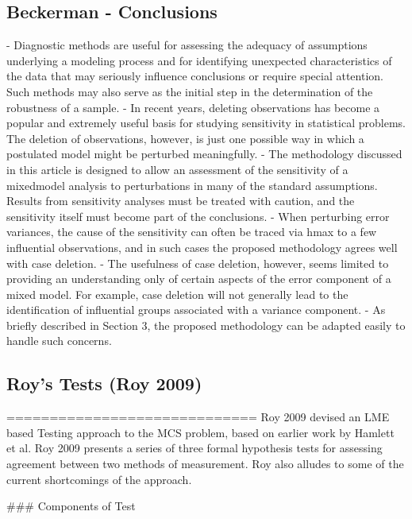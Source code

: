 
\newpage
\subsection*{Beckerman - Conclusions}


- Diagnostic methods are useful for assessing the
adequacy of assumptions underlying a modeling process
and for identifying unexpected characteristics of
the data that may seriously influence conclusions or
require special attention. Such methods may also
serve as the initial step in the determination of the
robustness of a sample.
- In recent years, deleting observations has become
a popular and extremely useful basis for studying
sensitivity in statistical problems. The deletion of observations,
however, is just one possible way in which
a postulated model might be perturbed meaningfully.
- The methodology discussed in this article is designed
to allow an assessment of the sensitivity of a mixedmodel
analysis to perturbations in many of the standard
assumptions. Results from sensitivity analyses
must be treated with caution, and the sensitivity itself
must become part of the conclusions. 
- When perturbing error variances, the cause of the sensitivity
can often be traced via hmax to a few influential observations,
and in such cases the proposed methodology
agrees well with case deletion. 
- The usefulness of case
deletion, however, seems limited to providing an understanding
only of certain aspects of the error component
of a mixed model. For example, case deletion
will not generally lead to the identification of influential
groups associated with a variance component. 
- As
briefly described in Section 3, the proposed methodology
can be adapted easily to handle such concerns.



\newpage

\subsection*{Roy’s Tests (Roy 2009)}
=============================
Roy 2009 devised an LME based Testing approach to the MCS problem, based on earlier work by Hamlett et al. 
Roy 2009 presents a series of three formal hypothesis tests for assessing agreement between two methods of measurement.
Roy also alludes to some of the current shortcomings of the approach.

### Components of Test

